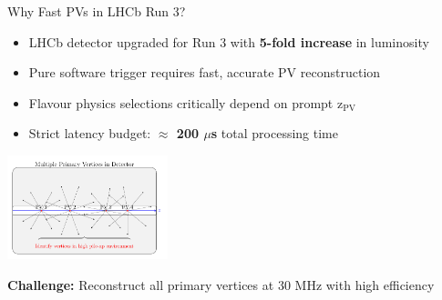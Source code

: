 \documentclass[10pt,aspectratio=169]{beamer}
\begin{document}
\begin{frame}{Why Fast PVs in LHCb Run 3?}
  \begin{itemize}
    \item LHCb detector upgraded for Run 3 with \textbf{5-fold increase} in luminosity
    \item Pure software trigger requires fast, accurate PV reconstruction
    \item Flavour physics selections critically depend on prompt z$_{\text{PV}}$
    \item Strict latency budget: \textbf{$\approx$ 200 $\mu$s} total processing time
  \end{itemize}

  \begin{center}
\includegraphics[width=0.35\textwidth]{figures/pvs.pdf}
\end{center}

  \pause
  \vspace{-0.3cm}
  \textbf{Challenge:} Reconstruct all primary vertices at 30 MHz with high efficiency
\end{frame}
\end{document}
